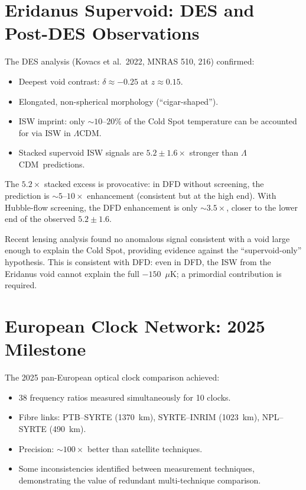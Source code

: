 \documentclass[11pt,a4paper]{article}
\newcommand{\LCDM}{$\Lambda$CDM}
\begin{document}
\section{Eridanus Supervoid: DES and Post-DES Observations}
\label{sec:Eridanus}

The DES analysis (Kovacs et al.\ 2022, MNRAS 510, 216) confirmed:
\begin{itemize}[nosep]
\item Deepest void contrast: $\delta \approx -0.25$ at $z \approx 0.15$.
\item Elongated, non-spherical morphology (``cigar-shaped'').
\item ISW imprint: only $\sim 10$--$20\%$ of the Cold Spot temperature
  can be accounted for via ISW in \LCDM.
\item Stacked supervoid ISW signals are $5.2 \pm 1.6\times$ stronger
  than \LCDM\ predictions.
\end{itemize}

The $5.2\times$ stacked excess is provocative: in DFD without
screening, the prediction is $\sim 5$--$10\times$ enhancement
(consistent but at the high end). With Hubble-flow screening, the
DFD enhancement is only $\sim 3.5\times$, closer to the lower
end of the observed $5.2 \pm 1.6$.

Recent lensing analysis found no anomalous signal consistent with
a void large enough to explain the Cold Spot, providing evidence
against the ``supervoid-only'' hypothesis. This is consistent with
DFD: even in DFD, the ISW from the Eridanus void cannot explain
the full $-150$~$\mu$K; a primordial contribution is required.

\section{European Clock Network: 2025 Milestone}
\label{sec:clocks-2025}

The 2025 pan-European optical clock comparison achieved:
\begin{itemize}[nosep]
\item 38 frequency ratios measured simultaneously for 10 clocks.
\item Fibre links: PTB--SYRTE (1370~km), SYRTE--INRIM (1023~km),
  NPL--SYRTE (490~km).
\item Precision: $\sim 100\times$ better than satellite techniques.
\item Some inconsistencies identified between measurement techniques,
  demonstrating the value of redundant multi-technique comparison.
\end{itemize}
\end{document}
